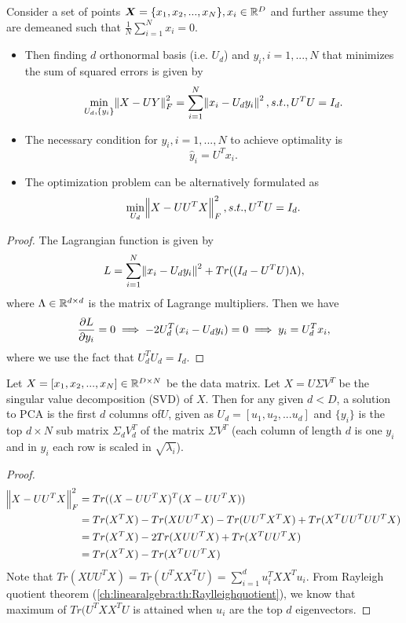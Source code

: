 \begin{refsection}
\begin{lemma}
Consider a set of points $\bm{X}=\{x_1,x_2,...,x_N\},x_i\in \mathbb{R}^D$ and further assume they are demeaned such that $\frac{1}{N}\sum_{i=1}^N x_i = 0$. 
\begin{itemize}
	\item Then finding $d$ orthonormal basis (i.e. $U_d$) and $y_i, i=1,...,N$ that minimizes the sum of squared errors is given by		
	$$\min_{U_d, \{y_i\}} \norm{X-UY}^2_F = \sum_{i=1}^N \norm{x_i - U_dy_i}^2, s.t., U^TU = I_d.$$
	\item The necessary condition for $y_i, i=1, ..., N$ to achieve optimality is
	$$\hat{y}_i = U^Tx_i.$$
	\item The optimization problem can be alternatively formulated as
	$$\min_{U_d} \norm{X-UU^TX}^2_F, s.t., U^TU = I_d.$$
\end{itemize}
\end{lemma}
\begin{proof}
The Lagrangian function is given by
$$L = \sum_{i=1}^{N}\norm{x_i - U_dy_i}^2 + Tr((I_d - U^TU)\Lambda),$$
where $\Lambda\in \mathbb{R}^{d\times d}$ is the matrix of Lagrange multipliers. Then we have
$$\frac{\partial L}{\partial y_i} = 0 \implies -2U^T_d(x_i - U_dy_i) = 0 \implies y_i = U^T_dx_i,$$
where we use the fact that $U^T_dU_d = I_d$.
\end{proof}


\begin{theorem}
\cite[21]{ma2002generalized}Let $X = [x_1,x_2,...,x_N] \in \mathbb{R}^{D\times N}$ be the data matrix. Let $X = U\Sigma V^T$ be the singular value decomposition (SVD) of $X$. Then for any given $d < D$, a solution to PCA is the first $d$ columns of$U$, given as $U_d = [u_1,u_2,...u_d]$ and $\{y_i\}$ is the top $d\times N$ sub matrix $\Sigma_d V_d^T$ of the matrix $\Sigma V^T$ (each column of length $d$ is one $y_i$ and in $y_i$ each row is scaled in $\sqrt{\lambda_i}$). 
\end{theorem}
\begin{proof}
\begin{align*}
    \norm{X - UU^TX}^2_F &= Tr((X - UU^TX)^T(X - UU^TX))\\
            &=Tr(X^TX) - Tr(XUU^TX) - Tr(UU^TX^TX) + Tr(X^TUU^TUU^TX)\\
            &=Tr(X^TX) - 2Tr(XUU^TX) + Tr(X^TUU^TX)\\
            &=Tr(X^TX) - Tr(X^TUU^TX)\\
\end{align*}
Note that
$Tr(XUU^TX) = Tr(U^TXX^TU) = \sum_{i=1}^d u_i^T XX^T u_i$.
From Rayleigh quotient theorem (\autoref{ch:linearalgebra:th:Raylleighquotient}), we know that maximum of $Tr(U^TXX^TU$ is attained when $u_i$ are the top $d$ eigenvectors. 
\end{proof}


\end{refsection}
